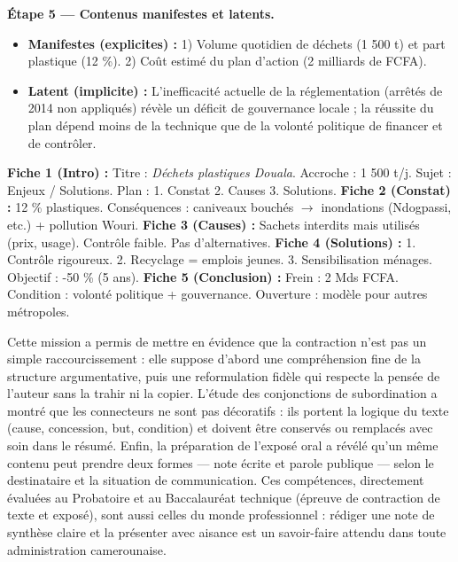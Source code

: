 \documentclass[11pt]{article}
\newcommand{\cle}[1]{{\popxbold\color{popdark}#1}}
\newcounter{popsec}
\newcounter{popsub}
\newcommand{\courssub}[1]{%
  \stepcounter{popsub}%
  \par\vspace{9pt}\noindent{\popxbold\fontsize{11.5}{13}\selectfont\color{popink}{\color{poporange}\thepopsec.\thepopsub}\hspace{6pt}#1}\par\nopagebreak\vspace{4pt}
}
\begin{document}
\begin{exoresolu}
\textbf{Étape 5 — Contenus manifestes et latents.}
\begin{itemize}
\item \textbf{Manifestes (explicites) :} 1) Volume quotidien de déchets (1 500 t) et part plastique (12 \%). 2) Coût estimé du plan d'action (2 milliards de FCFA).
\item \textbf{Latent (implicite) :} L'inefficacité actuelle de la réglementation (arrêtés de 2014 non appliqués) révèle un déficit de gouvernance locale ; la réussite du plan dépend moins de la technique que de la volonté politique de financer et de contrôler.
\end{itemize}
\end{exoresolu}

\begin{exemplebox}
\textbf{Fiche 1 (Intro) :} Titre : \emph{Déchets plastiques Douala}. Accroche : 1 500 t/j. Sujet : Enjeux / Solutions. Plan : 1. Constat 2. Causes 3. Solutions.
\textbf{Fiche 2 (Constat) :} 12 \% plastiques. Conséquences : caniveaux bouchés $\rightarrow$ inondations (Ndogpassi, etc.) + pollution Wouri.
\textbf{Fiche 3 (Causes) :} Sachets interdits mais utilisés (prix, usage). Contrôle faible. Pas d'alternatives.
\textbf{Fiche 4 (Solutions) :} 1. Contrôle rigoureux. 2. Recyclage = emplois jeunes. 3. Sensibilisation ménages. Objectif : -50 \% (5 ans).
\textbf{Fiche 5 (Conclusion) :} Frein : 2 Mds FCFA. Condition : volonté politique + gouvernance. Ouverture : modèle pour autres métropoles.
\end{exemplebox}

\courssub{Bilan de l'activité}

Cette mission a permis de mettre en évidence que la contraction n'est pas un simple raccourcissement : elle suppose d'abord une \cle{compréhension fine} de la structure argumentative, puis une \cle{reformulation fidèle} qui respecte la pensée de l'auteur sans la trahir ni la copier. L'étude des conjonctions de subordination a montré que les connecteurs ne sont pas décoratifs : ils portent la logique du texte (cause, concession, but, condition) et doivent être conservés ou remplacés avec soin dans le résumé. Enfin, la préparation de l'exposé oral a révélé qu'un même contenu peut prendre deux formes — note écrite et parole publique — selon le destinataire et la situation de communication. Ces compétences, directement évaluées au Probatoire et au Baccalauréat technique (épreuve de contraction de texte et exposé), sont aussi celles du monde professionnel : rédiger une note de synthèse claire et la présenter avec aisance est un savoir-faire attendu dans toute administration camerounaise.
\end{document}
